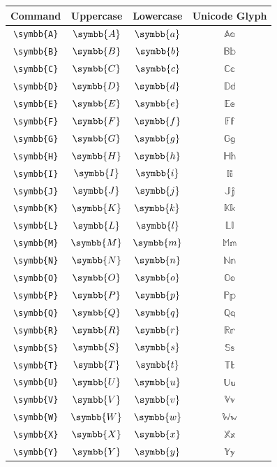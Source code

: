 \documentclass[12pt,a4paper]{article}
\begin{document}
\begin{longtable}{|c|c|c|c|}
\hline
\textbf{Command} & \textbf{Uppercase} & \textbf{Lowercase} & \textbf{Unicode Glyph} \\
\hline
\verb|\symbb{A}| & $\symbb{A}$ & $\symbb{a}$ & $ 𝔸 𝕒 $ \\
\verb|\symbb{B}| & $\symbb{B}$ & $\symbb{b}$ & $ 𝔹 𝕓 $ \\
\verb|\symbb{C}| & $\symbb{C}$ & $\symbb{c}$ & $ ℂ 𝕔 $ \\
\verb|\symbb{D}| & $\symbb{D}$ & $\symbb{d}$ & $ 𝔻 𝕕 $ \\
\verb|\symbb{E}| & $\symbb{E}$ & $\symbb{e}$ & $ 𝔼 𝕖 $ \\
\verb|\symbb{F}| & $\symbb{F}$ & $\symbb{f}$ & $ 𝔽 𝕗 $ \\
\verb|\symbb{G}| & $\symbb{G}$ & $\symbb{g}$ & $ 𝔾 𝕘 $ \\
\verb|\symbb{H}| & $\symbb{H}$ & $\symbb{h}$ & $ ℍ 𝕙 $ \\
\verb|\symbb{I}| & $\symbb{I}$ & $\symbb{i}$ & $ 𝕀 𝕚 $ \\
\verb|\symbb{J}| & $\symbb{J}$ & $\symbb{j}$ & $ 𝕁 𝕛 $ \\
\verb|\symbb{K}| & $\symbb{K}$ & $\symbb{k}$ & $ 𝕂 𝕜 $ \\
\verb|\symbb{L}| & $\symbb{L}$ & $\symbb{l}$ & $ 𝕃 𝕝 $ \\
\verb|\symbb{M}| & $\symbb{M}$ & $\symbb{m}$ & $ 𝕄 𝕞 $ \\
\verb|\symbb{N}| & $\symbb{N}$ & $\symbb{n}$ & $ ℕ 𝕟 $ \\
\verb|\symbb{O}| & $\symbb{O}$ & $\symbb{o}$ & $ 𝕆 𝕠 $ \\
\verb|\symbb{P}| & $\symbb{P}$ & $\symbb{p}$ & $ ℙ 𝕡 $ \\
\verb|\symbb{Q}| & $\symbb{Q}$ & $\symbb{q}$ & $ ℚ 𝕢 $ \\
\verb|\symbb{R}| & $\symbb{R}$ & $\symbb{r}$ & $ ℝ 𝕣 $ \\
\verb|\symbb{S}| & $\symbb{S}$ & $\symbb{s}$ & $ 𝕊 𝕤 $ \\
\verb|\symbb{T}| & $\symbb{T}$ & $\symbb{t}$ & $ 𝕋 𝕥 $ \\
\verb|\symbb{U}| & $\symbb{U}$ & $\symbb{u}$ & $ 𝕌 𝕦 $ \\
\verb|\symbb{V}| & $\symbb{V}$ & $\symbb{v}$ & $ 𝕍 𝕧 $ \\
\verb|\symbb{W}| & $\symbb{W}$ & $\symbb{w}$ & $ 𝕎 𝕨 $ \\
\verb|\symbb{X}| & $\symbb{X}$ & $\symbb{x}$ & $ 𝕏 𝕩 $ \\
\verb|\symbb{Y}| & $\symbb{Y}$ & $\symbb{y}$ & $ 𝕐 𝕪 $ \\

\end{longtable}
\end{document}
